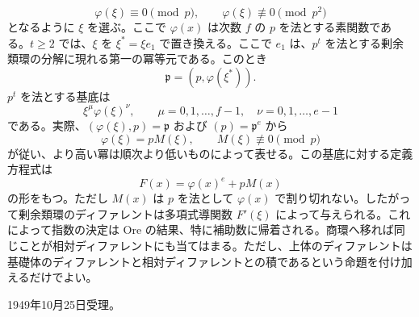 \documentclass[11pt]{article}
\begin{document}
\[
        \varphi(\xi)\equiv0\pmod p,
        \qquad
        \varphi(\xi)\not\equiv0\pmod {p^2}
\]
となるように \(\xi\) を選ぶ。ここで \(\varphi(x)\) は次数 \(f\) の \(p\) を法とする素関数である。\(t\ge2\) では、\(\xi\) を \(\xi^*=\xi e_1\) で置き換える。ここで \(e_1\) は、\(p^t\) を法とする剰余類環の分解に現れる第一の冪等元である。このとき
\[
        \mathfrak p=(p,\varphi(\xi^*)).
\]
\(p^t\) を法とする基底は
\[
        \xi^{\mu}\varphi(\xi)^{\nu},
        \qquad
        \mu=0,1,\ldots,f-1,
        \quad
        \nu=0,1,\ldots,e-1
\]
である。実際、\((\varphi(\xi),p)=\mathfrak p\) および \((p)=\mathfrak p^e\) から
\[
        \varphi(\xi)=pM(\xi),
        \qquad M(\xi)\not\equiv0\pmod p
\]
が従い、より高い冪は順次より低いものによって表せる。この基底に対する定義方程式は
\[
        F(x)=\varphi(x)^e+pM(x)
\]
の形をもつ。ただし \(M(x)\) は \(p\) を法として \(\varphi(x)\) で割り切れない。したがって剰余類環のディファレントは多項式導関数 \(F'(\xi)\) によって与えられる。これによって指数の決定は Ore の結果、特に補助数に帰着される。商環へ移れば同じことが相対ディファレントにも当てはまる。ただし、上体のディファレントは基礎体のディファレントと相対ディファレントとの積であるという命題を付け加えるだけでよい。

\begin{center}
1949年10月25日受理。
\end{center}
\end{document}
